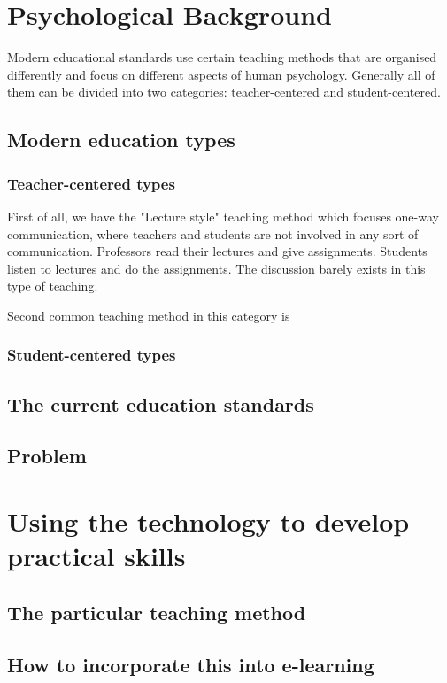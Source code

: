 \documentclass[10pt,oneside,english,a4paper]{article}
\begin{document}
\section{Psychological Background} \label{back}
Modern educational standards use certain teaching methods that are organised differently and focus on different aspects of human psychology.  Generally all of them can be divided into two categories: teacher-centered and student-centered.
\subsection{Modern education types}
\subsubsection{Teacher-centered types}
First of all, we have the "Lecture style"  teaching method which focuses one-way communication, where teachers and students are not involved in any sort of communication. Professors read their lectures and give assignments. Students listen to lectures and do the assignments. The discussion barely exists in this type of teaching. \par
Second common teaching method in this category is 

\subsubsection{Student-centered types}

\subsection{The current education standards}

\subsection{Problem}

\section{Using the technology to develop practical skills} \label{chan}

\subsection{The particular teaching method}

\subsection{How to incorporate this into e-learning}
\end{document}
